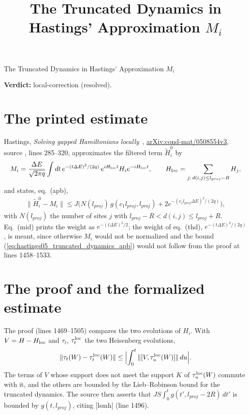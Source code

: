 \documentclass{article}
\title{The Truncated Dynamics in Hastings' Approximation $M_i$}
\author{}
\date{}
\providecommand{\gapnote}[2]{\par\noindent\textbf{Verdict:} #1 (#2).\par}
\begin{document}
\begin{center}
 {\Large The Truncated Dynamics in Hastings' Approximation $M_i$}
\end{center}
\medskip
\gapnote{local-correction}{resolved}

\section{The printed estimate}
Hastings, \emph{Solving gapped Hamiltonians locally}~\cite{Hastings2006Solving},
\href{https://arxiv.org/abs/cond-mat/0508554v3}{arXiv:cond-mat/0508554v3},
source , lines 285--320, approximates the filtered term
$\tilde H_i^0$ by
\begin{align}
 M_i=\frac{\Delta E}{\sqrt{2\pi q}}\int dt\,e^{-(t\Delta E)^2/(2q)}\,
 e^{iH_{\rm loc}t}H_ie^{-iH_{\rm loc}t},\qquad
 H_{\rm loc}=\sum_{j:\,d(i,j)\le l_{proj}-R}H_j,
 \label{eq:hastings05_truncated_dynamics_mi}
\end{align}
and states, eq.~(apb),
\begin{align}
 \|\tilde H_i^0-M_i\|\le J\bigl(N(l_{proj})\,g(c_1l_{proj},l_{proj})
 +2e^{-(c_1l_{proj}\Delta E)^2/(2q)}\bigr),
 \label{eq:hastings05_truncated_dynamics_apb}
\end{align}
with $N(l_{proj})$ the number of sites $j$ with
$l_{proj}-R<d(i,j)\le l_{proj}+R$. Eq.~(mid) prints the weight as
$e^{-(t\Delta E)^2/2}$; the weight of eq.~(thd), $e^{-(t\Delta E)^2/(2q)}$, is
meant, since otherwise $M_i$ would not be normalized and the bound
(\ref{eq:hastings05_truncated_dynamics_apb}) would not follow from the proof at
lines 1458--1533.

\section{The proof and the formalized estimate}
The proof (lines 1469--1505) compares the two evolutions of $H_i$. With
$V=H-H_{\rm loc}$ and $\tau_t$, $\tau^{\rm loc}_t$ the two Heisenberg evolutions,
\begin{align}
 \|\tau_t(W)-\tau^{\rm loc}_t(W)\|\le\Bigl|\int_0^t
 \|[V,\tau^{\rm loc}_u(W)]\|\,du\Bigr|.
 \label{eq:hastings05_truncated_dynamics_duhamel}
\end{align}
The terms of $V$ whose support does not meet the support $K$ of
$\tau^{\rm loc}_u(W)$ commute with it, and the others are bounded by the
Lieb--Robinson bound for the truncated dynamics. The source then asserts that
$JS\int_0^tg(t',l_{proj}-2R)\,dt'$ is bounded by $g(t,l_{proj})$, citing
[lsmh] (line 1496).
\end{document}
